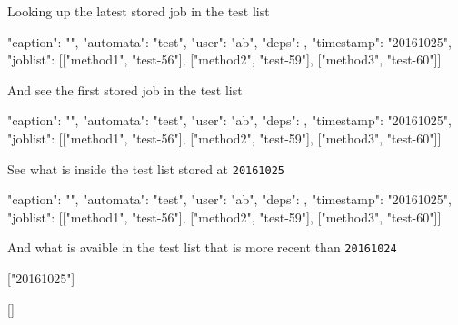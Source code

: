 Looking up the latest stored job in the test list
\begin{shell}
{"caption": "", "automata": "test", "user": "ab", "deps": {},
  "timestamp": "20161025", "joblist": [["method1", "test-56"],
  ["method2", "test-59"], ["method3", "test-60"]]}
\end{shell}
And see the first stored job in the test list
\begin{shell}
{"caption": "", "automata": "test", "user": "ab", "deps": {},
  "timestamp": "20161025", "joblist": [["method1", "test-56"],
  ["method2", "test-59"], ["method3", "test-60"]]}
\end{shell}
See what is inside the test list stored at \texttt{20161025}
\begin{shell}
{"caption": "", "automata": "test", "user": "ab", "deps": {},
  "timestamp": "20161025", "joblist": [["method1", "test-56"],
  ["method2", "test-59"], ["method3", "test-60"]]}
\end{shell}
And what is avaible in the test list that is more recent than \texttt{20161024}
\begin{shell}
["20161025"]
\end{shell}
\begin{shell}
[]
\end{shell}
